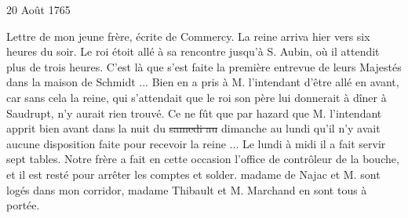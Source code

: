                      \begin{diary}{20 Août 1765}{}

                         Lettre de mon jeune frère, écrite de Commercy. \og
                              La reine arriva
                              hier vers six heures du
                              soir. Le roi étoit
                              allé à sa rencontre jusqu'à
                              S. Aubin, où il attendit
                              plus de trois heures.
                              C'est là que s'est faite la première entrevue
                              de leurs Majestés dans la maison de Schmidt ...
                              Bien en a pris à M.
                                 l'intendant d'être allé
                              en avant, car sans cela la reine, qui s'attendait
                              que le roi son père
                              lui donnerait à dîner à
                              Saudrupt, n'y aurait
                              rien trouvé. Ce ne fût
                              que par hazard que M.
                                 l'intendant
                              apprit
                              bien avant dans la nuit du \sout{samedi au}
                              dimanche au lundi qu'il n'y avait
                              aucune disposition
                              faite pour recevoir la
                                 reine ... Le lundi
                              à midi il a fait servir sept tables. Notre
                                 frère a fait en cette occasion l'office de
                              contrôleur de la bouche, et
                              il est resté pour
                              arrêter les comptes et solder. madame de Najac
                              et M. sont logés dans mon
                              corridor, madame
                                 Thibault et M. Marchand en sont tous
                              à portée.  \fg{}
                        \bigskip


                     \end{diary}

